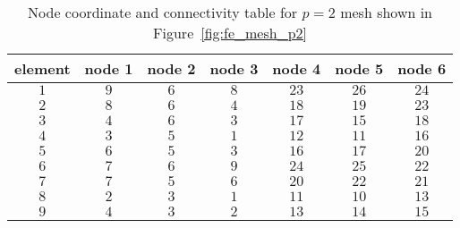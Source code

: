 \begin{table}
{    \begin{tabular}{c|cccccc}
      element & node 1 & node 2 & node 3 & node 4 & node 5 & node 6\\
      \hline
$1$ & $9$ & $6$ & $8$ & $23$ & $26$ & $24$ \\ 
$2$ & $8$ & $6$ & $4$ & $18$ & $19$ & $23$ \\ 
$3$ & $4$ & $6$ & $3$ & $17$ & $15$ & $18$ \\ 
$4$ & $3$ & $5$ & $1$ & $12$ & $11$ & $16$ \\ 
$5$ & $6$ & $5$ & $3$ & $16$ & $17$ & $20$ \\ 
$6$ & $7$ & $6$ & $9$ & $24$ & $25$ & $22$ \\ 
$7$ & $7$ & $5$ & $6$ & $20$ & $22$ & $21$ \\ 
$8$ & $2$ & $3$ & $1$ & $11$ & $10$ & $13$ \\ 
$9$ & $4$ & $3$ & $2$ & $13$ & $14$ & $15$ \\ 
    \end{tabular}
  }
  \caption{Node coordinate and connectivity table for $p=2$ mesh shown in Figure~\ref{fig:fe_mesh_p2}}
\end{table}









